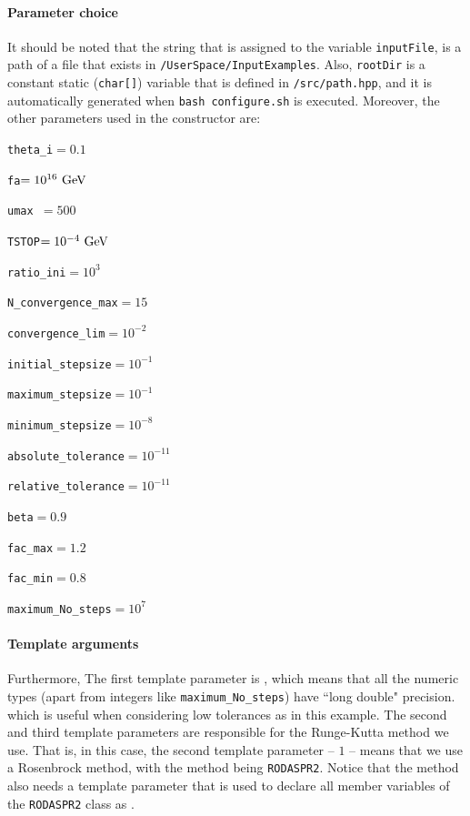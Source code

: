 \documentclass[11pt,a4paper]{article}
\begin{document}
\paragraph{Parameter choice}
%
It should be noted that the string that is assigned to the variable {\tt inputFile}, is a path of a file that exists in {\tt \mimes/UserSpace/InputExamples}. Also, {\tt rootDir} is a constant static ({\tt char[]}) variable that  is defined in {\tt \mimes/src/path.hpp}, and it is automatically generated when {\tt bash configure.sh} is executed.  Moreover, the other parameters used in the constructor are:
%
\begin{itemize}
	\begin{minipage}{0.3\linewidth}
	\item {\tt theta\_i}$=0.1$
	\item {\tt fa}$=10^{16}~{\rm GeV}$
	\item {\tt umax }$=500$
	\item {\tt TSTOP}$=10^{-4}~{\rm GeV}$
	\item {\tt ratio\_ini}$=10^3$
	\item  {\tt N\_convergence\_max}$=15$
	\end{minipage}
	\begin{minipage}{0.35\linewidth}
	\item  {\tt convergence\_lim}$=10^{-2}$
	\item {\tt initial\_stepsize}$=10^{-1}$ 
	\item {\tt maximum\_stepsize}$=10^{-1}$ 
	\item {\tt minimum\_stepsize}$=10^{-8}$
	\item {\tt absolute\_tolerance}$=10^{-11}$
	\item {\tt relative\_tolerance}$=10^{-11}$
	\end{minipage}
	\begin{minipage}{0.3\linewidth}
	\item {\tt beta}$=0.9$
	\item {\tt fac\_max}$=1.2$
	\item {\tt fac\_min}$=0.8$
	\item {\tt maximum\_No\_steps}$=10^7$
	\item[]{\vfill}	\item[]{\vfill}	\item[]{\vfill}
	\end{minipage}
\end{itemize}

\paragraph{Template arguments}
%
Furthermore, The first template parameter is , which means that all the numeric types (apart from integers like {\tt maximum\_No\_steps}) have ``long double" precision. which is useful when considering low tolerances as in this example. The second and third template parameters are responsible for the Runge-Kutta method we use. That is, in this case, the second template parameter -- $1$ -- means that we use a Rosenbrock method, with the method being {\tt RODASPR2}. Notice that the method also needs a template parameter that is used to declare all member variables of the {\tt RODASPR2} class as .
\end{document}
